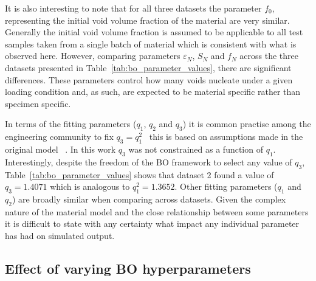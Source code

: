 \documentclass[preprint, review, 12pt]{elsarticle}
\begin{document}
{	It is also interesting to note that for all three datasets the parameter $f_0$, representing the initial void volume fraction of the material are very similar.
	Generally the initial void volume fraction is assumed to be applicable to all test samples taken from a single batch of material which is consistent with what is observed here.
	However, comparing parameters $\varepsilon_N$, $S_N$ and $f_N$ across the three datasets presented in Table~\ref{tab:bo_parameter_values}, there are significant differences.
	These parameters control how many voids nucleate under a given loading condition and, as such, are expected to be material specific rather than specimen specific.

	In terms of the fitting parameters ($q_1$, $q_2$ and $q_3$) it is common practise among the engineering community to fix $q_3 = q_1^2$~\cite{ABBASI2011,ROUSSELIER2019, YAN2021} this is based on assumptions made in the original model ~\cite{TVERGAARD1981a}.
	In this work $q_3$ was not constrained as a function of $q_1$.
	Interestingly, despite the freedom of the BO framework to select any value of $q_3$, Table~\ref{tab:bo_parameter_values} shows that dataset 2 found a value of $q_3=1.4071$ which is analogous to $q_1^2=1.3652$.
	Other fitting parameters ($q_1$ and $q_2$) are broadly similar when comparing across datasets.
	Given the complex nature of the material model and the close relationship between some parameters it is difficult to state with any certainty what impact any individual parameter has had on simulated output.

	\subsection{Effect of varying BO hyperparameters}
	\label{h:unique}

}
\end{document}
